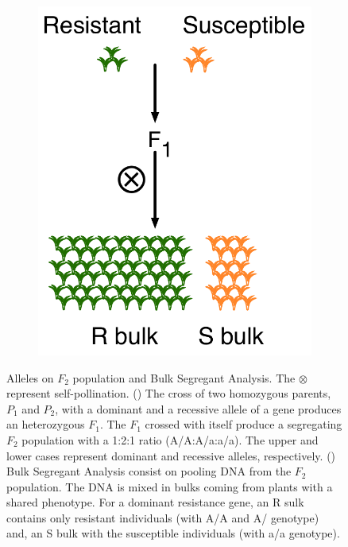 \begin{figure}
\begin{subfigure}{0.5\textwidth}
   \includegraphics[height=0.3\textheight]{Yr15/Figures/BSA.pdf}
  \end{subfigure}
   \caption[Alleles on $F_2$ population and Bulk Segregant Analysis.]{Alleles on $F_2$ population and Bulk Segregant Analysis. The $\otimes$ represent self-pollination. () The cross of two homozygous parents, $P_{1}$ and $P_{2}$, with a dominant and a recessive allele of a gene produces an heterozygous $F_{1}$. The $F_{1}$ crossed with itself produce a segregating $F_{2}$ population with a 1:2:1 ratio (A/A:A/a:a/a). The upper and lower cases represent dominant and recessive alleles, respectively. () Bulk Segregant Analysis consist on pooling DNA from the $F_{2}$ population. The DNA is mixed in bulks coming from plants with a shared phenotype. For a dominant resistance gene, an R sulk contains only resistant individuals (with A/A and A/ genotype) and, an S bulk with the susceptible individuals (with a/a genotype). } 
  
\end{figure}

